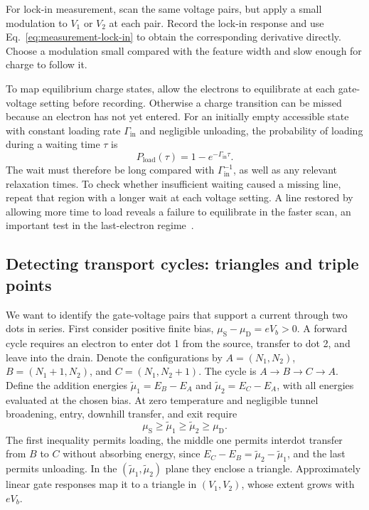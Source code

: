 For lock-in measurement, scan the same voltage pairs, but apply
a small modulation to $V_1$ or $V_2$ at each pair. Record the
lock-in response and use Eq.~\eqref{eq:measurement-lock-in} to
obtain the corresponding derivative directly. Choose a modulation
small compared with the feature width and slow enough for charge
to follow it.

To map equilibrium charge states, allow the electrons to equilibrate
at each gate-voltage setting before recording. Otherwise a charge
transition can be missed because an electron has not yet entered.
For an initially empty accessible state with constant loading rate
$\Gamma_{\mathrm{in}}$ and negligible unloading, the probability
of loading during a waiting time $\tau$ is
\begin{equation}
 P_{\mathrm{load}}(\tau)=1-e^{-\Gamma_{\mathrm{in}}\tau}.
 \label{eq:measurement-loading-probability}
\end{equation}
The wait must therefore be long compared with
$\Gamma_{\mathrm{in}}^{-1}$, as well as any relevant relaxation
times. To check whether insufficient waiting caused a missing line,
repeat that region with a longer wait at each voltage setting.
A line restored by allowing more time to load
reveals a failure to equilibrate in the faster scan, an important
test in the last-electron regime~\cite{Thalakulam2010}.

\subsection{Detecting transport cycles: triangles and triple points}
\label{sec:measurement-bias-triangles}

We want to identify the gate-voltage pairs that support a current
through two dots in series. First consider positive finite bias,
$\mu_{\mathrm S}-\mu_{\mathrm D}=eV_b>0$. A forward cycle requires
an electron to enter dot 1 from the source, transfer to dot 2,
and leave into the drain. Denote the configurations by
$A=(N_1,N_2)$, $B=(N_1+1,N_2)$, and $C=(N_1,N_2+1)$.
The cycle is $A\to B\to C\to A$. Define the addition energies
$\widetilde\mu_1=E_B-E_A$ and
$\widetilde\mu_2=E_C-E_A$, with all energies evaluated at the
chosen bias. At zero temperature and negligible tunnel broadening,
entry, downhill transfer, and exit require
\begin{equation}
 \mu_{\mathrm S}\geq\widetilde\mu_1
       \geq\widetilde\mu_2\geq\mu_{\mathrm D}.
 \label{eq:measurement-triangle-window}
\end{equation}
The first inequality permits loading, the middle one permits
interdot transfer from $B$ to $C$ without absorbing energy, since
$E_C-E_B=\widetilde\mu_2-\widetilde\mu_1$, and the last permits
unloading.
In the $(\widetilde\mu_1,\widetilde\mu_2)$ plane they enclose a
triangle. Approximately linear gate responses map it to a triangle
in $(V_1,V_2)$, whose extent grows with $eV_b$.

